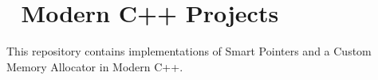 \chapter{🚀 Modern C++ Projects}
\hypertarget{md__r_e_a_d_m_e}{}\label{md__r_e_a_d_m_e}
\label{md__r_e_a_d_m_e_autotoc_md0}%
%


This repository contains implementations of Smart Pointers and a Custom Memory Allocator in Modern C++. 